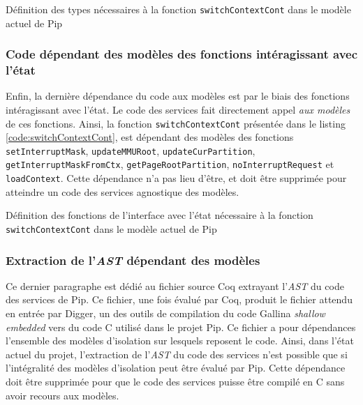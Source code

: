 			\begin{listing}[!ht]
				\caption{Définition des types nécessaires à la fonction \texttt{switchContextCont} dans le modèle actuel de Pip}
				\label{code:CurrentTypesModel}
			\end{listing}

			\subsubsection{Code dépendant des modèles des fonctions intéragissant avec l'état}
			Enfin, la dernière dépendance du code aux modèles est par le biais des fonctions intéragissant avec l'état. Le code des services fait directement appel \emph{aux modèles} de ces fonctions. Ainsi, la fonction \texttt{switchContextCont} présentée dans le listing \ref{code:switchContextCont}, est dépendant des modèles des fonctions \texttt{setInterruptMask}, \texttt{updateMMURoot}, \texttt{updateCurPartition}, \texttt{getInterruptMaskFromCtx}, \texttt{getPageRootPartition}, \texttt{noInterruptRequest} et \texttt{loadContext}. Cette dépendance n'a pas lieu d'être, et doit être supprimée pour atteindre un code des services agnostique des modèles.

			\begin{listing}[!ht]
				\caption{Définition des fonctions de l'interface avec l'état nécessaire à la fonction \texttt{switchContextCont} dans le modèle actuel de Pip}
				\label{code:CurrentFunctionsModel}
			\end{listing}

			\subsubsection{Extraction de l'\emph{AST} dépendant des modèles}
			Ce dernier paragraphe est dédié au fichier source Coq extrayant l'\emph{AST} du code des services de Pip. Ce fichier, une fois évalué par Coq, produit le fichier attendu en entrée par Digger, un des outils de compilation du code Gallina \emph{shallow embedded} vers du code C utilisé dans le projet Pip. Ce fichier a pour dépendances l'ensemble des modèles d'isolation sur lesquels reposent le code. Ainsi, dans l'état actuel du projet, l'extraction de l'\emph{AST} du code des services n'est possible que si l'intégralité des modèles d'isolation peut être évalué par Pip. Cette dépendance doit être supprimée pour que le code des services puisse être compilé en C sans avoir recours aux modèles.


